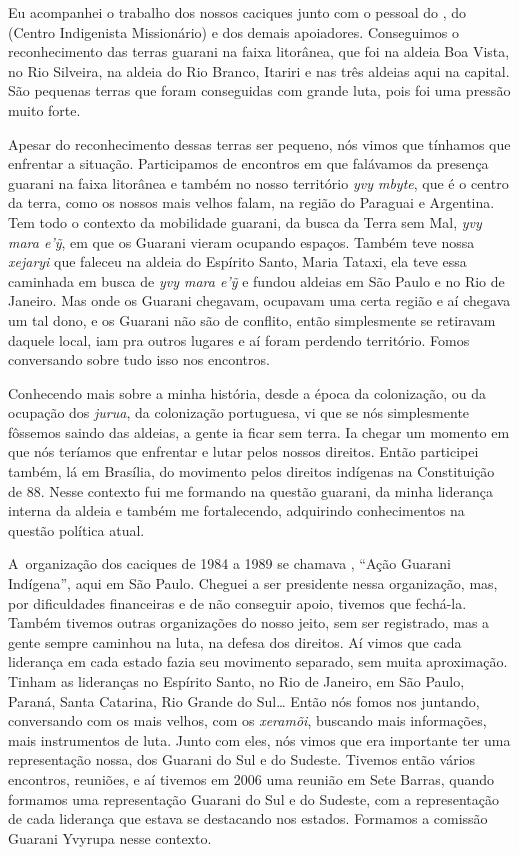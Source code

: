 Eu acompanhei o trabalho dos nossos caciques junto com o pessoal do ,
do  (Centro Indigenista Missionário) e dos demais apoiadores.
Conseguimos o reconhecimento das terras guarani na faixa litorânea, que
foi na aldeia Boa Vista, no Rio Silveira, na aldeia do Rio Branco,
Itariri e nas três aldeias aqui na capital. São pequenas terras que
foram conseguidas com grande luta, pois foi uma pressão muito forte. 

Apesar do reconhecimento dessas terras ser pequeno, nós vimos que
tínhamos que enfrentar a situação. Participamos de encontros em que
falávamos da presença guarani na faixa litorânea e também no nosso
território \emph{yvy mbyte}, que é o centro da terra, como os nossos mais
velhos falam, na região do Paraguai e Argentina. Tem todo o contexto da
mobilidade guarani, da busca da Terra sem Mal, \emph{yvy mara e’ỹ}, em que
os Guarani vieram ocupando espaços. Também teve nossa \emph{xejaryi} que
faleceu na aldeia do Espírito Santo, Maria Tataxi, ela
teve essa caminhada em busca de \emph{yvy mara e’ỹ} e fundou aldeias em
São Paulo e no Rio de Janeiro. Mas onde os Guarani chegavam, ocupavam
uma certa região e aí chegava um tal dono, e os Guarani não são de
conflito, então simplesmente se retiravam daquele local, iam pra outros
lugares e aí foram perdendo território. Fomos conversando sobre tudo
isso nos encontros.

Conhecendo mais sobre a minha história, desde a época da colonização, ou
da ocupação dos \emph{jurua}, da colonização portuguesa, vi que se nós
simplesmente fôssemos saindo das aldeias, a gente ia ficar sem terra.
Ia chegar um momento em que nós teríamos que enfrentar e lutar pelos
nossos direitos. Então participei também, lá em Brasília, do movimento
pelos direitos indígenas na Constituição de 88. Nesse contexto fui me
formando na questão guarani, da minha liderança interna da aldeia e
também me fortalecendo, adquirindo conhecimentos na questão política
atual.

A~organização dos caciques de 1984 a 1989 se chamava , ``Ação
Guarani Indígena'', aqui em São Paulo. Cheguei a ser presidente nessa
organização, mas, por dificuldades financeiras e de não conseguir
apoio, tivemos que fechá-la. Também tivemos outras organizações do
nosso jeito, sem ser registrado, mas a gente sempre caminhou na luta,
na defesa dos direitos. Aí vimos que cada liderança em cada estado
fazia seu movimento separado, sem muita aproximação. Tinham as
lideranças no Espírito Santo, no Rio de Janeiro, em São Paulo, Paraná,
Santa Catarina, Rio Grande do Sul\ldots{} Então nós fomos nos juntando,
conversando com os mais velhos, com os \emph{xeramõi}, buscando mais
informações, mais instrumentos de luta. Junto com eles, nós vimos que
era importante ter uma representação nossa, dos Guarani do Sul e do
Sudeste. Tivemos então vários encontros, reuniões, e aí tivemos em 2006
uma reunião em Sete Barras, quando formamos uma representação Guarani
do Sul e do Sudeste, com a representação de cada liderança que estava
se destacando nos estados. Formamos a comissão Guarani Yvyrupa nesse
contexto. 

